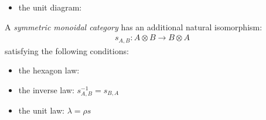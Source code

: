 \documentclass[DIN, pagenumber=false, fontsize=11pt, parskip=half, colorinlistoftodos, svgnames]{scrartcl}
\newcommand{\notimportantnote}[2][]{\todo[color=LightPink, #1]{#2}}
\begin{document}
\begin{definition}
\begin{itemize}
			\item the unit diagram:
			\begin{center}
			\end{center}
		\end{itemize}
		A \emph{symmetric monoidal category} has an additional natural isomorphism:
		\begin{align*}
			s_{A,B}: A \otimes B \rightarrow B \otimes A
		\end{align*}
		satisfying the following conditions:
		\begin{itemize}
			\item 
				the hexagon law:
				\begin{center}
				\end{center}
			\item 
				the inverse law: $s_{A, B}^{-1} = s_{B, A} $
			\item 
				the unit law: $\lambda = \rho s$
				\begin{center}
				\end{center}
		\end{itemize}
	\end{definition}
	
\end{document}
